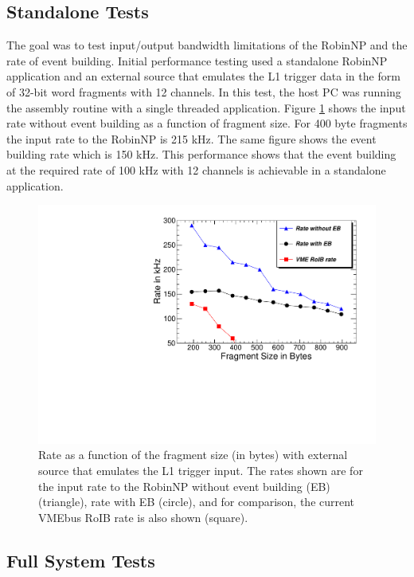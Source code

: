 \documentclass{JINST}
\begin{document}
\subsection{Standalone Tests}\label{sec:perf_alone}

The goal was to test input/output bandwidth limitations of the RobinNP and the rate of event building. Initial performance testing used 
a standalone RobinNP application and an external source that emulates the L1 trigger data 
in the form of 32-bit word fragments with 12 channels. In this test, the host PC was running the assembly routine with a single threaded application.  Figure \ref{fig:cern_robinnproib} shows the input rate without 
event building as a function of fragment size. For 400 byte fragments the input rate to the RobinNP is 215 kHz. 
The same figure 
shows the event building rate which is 150 kHz. This performance shows that the event building 
at the required rate of 100 kHz with 12 channels is achievable in a standalone application.  


\begin{figure}[tbp] %
\centering
\includegraphics[width=.7\textwidth]{figures/cern_robinnproib.pdf}
\caption{Rate as a function of the fragment size (in bytes) with external source that emulates the L1 trigger input. 
The rates shown are for the input rate to the RobinNP without event building (EB) (triangle), rate with EB (circle), and 
for comparison, the current VMEbus RoIB rate is also shown (square).  }
\label{fig:cern_robinnproib}
\end{figure}


\subsection{Full System Tests}\label{sec:perf_tdaq}
\end{document}
